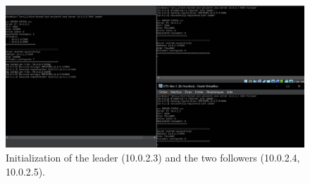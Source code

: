 \documentclass[a4paper,11pt]{article}
\begin{document}
\begin{figure}[H]
\centering
\includegraphics[width=1\linewidth]{images/Capture_connection des 3 serveurs .JPG}
\caption{Initialization of the leader (10.0.2.3) and the two followers (10.0.2.4, 10.0.2.5).}
\end{figure}
\end{document}
